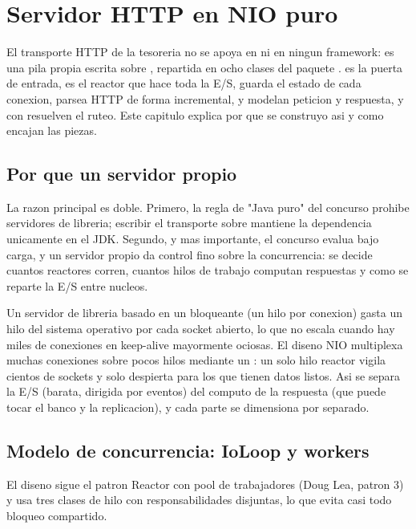 \section{Servidor HTTP en NIO puro}

El transporte HTTP de la tesoreria no se apoya en 
ni en ningun framework: es una pila propia escrita sobre , repartida
en ocho clases del paquete .  es la puerta de
entrada,  es el reactor que hace toda la E/S,
 guarda el estado de cada conexion, 
parsea HTTP de forma incremental,  y 
modelan peticion y respuesta, y  con 
resuelven el ruteo. Este capitulo explica por que se construyo asi y como encajan las
piezas.

\subsection{Por que un servidor propio}

La razon principal es doble. Primero, la regla de "Java puro" del concurso prohibe
servidores de libreria; escribir el transporte sobre  mantiene la
dependencia unicamente en el JDK. Segundo, y mas importante, el concurso evalua bajo
carga, y un servidor propio da control fino sobre la concurrencia: se decide cuantos
reactores corren, cuantos hilos de trabajo computan respuestas y como se reparte la
E/S entre nucleos.

Un servidor de libreria basado en un  bloqueante (un hilo por
conexion) gasta un hilo del sistema operativo por cada socket abierto, lo que no
escala cuando hay miles de conexiones en keep-alive mayormente ociosas. El diseno NIO
multiplexa muchas conexiones sobre pocos hilos mediante un : un solo
hilo reactor vigila cientos de sockets y solo despierta para los que tienen datos
listos. Asi se separa la E/S (barata, dirigida por eventos) del computo de la respuesta
(que puede tocar el banco y la replicacion), y cada parte se dimensiona por separado.

\subsection{Modelo de concurrencia: IoLoop y workers}

El diseno sigue el patron Reactor con pool de trabajadores (Doug Lea, patron 3) y usa
tres clases de hilo con responsabilidades disjuntas, lo que evita casi todo bloqueo
compartido.

